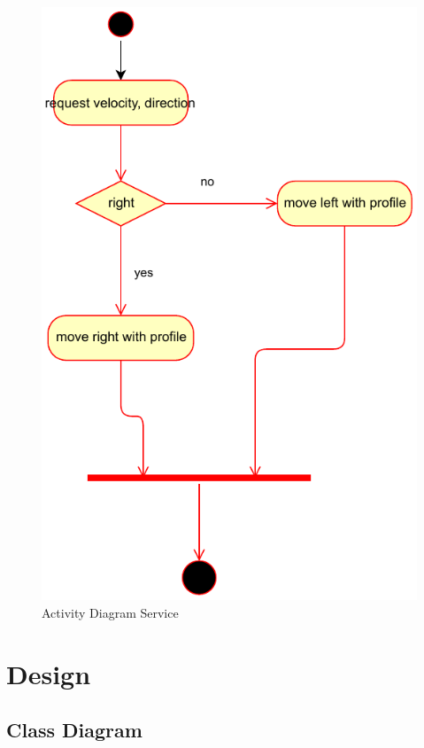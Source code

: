 \documentclass[a4paper,12pt,twoside]{scrreprt}
\begin{document}
\begin{figure}[H]
	\centering
	\includegraphics[width=\textwidth,height=\textheight,keepaspectratio]{activityDiagram/activitychartServiceMode.pdf}
	\caption[Activity Diagram Service]{Activity Diagram Service}
	\label{fig:ActivityDiagramService}
\end{figure}

\chapter{Design}

\section{Class Diagram}
\label{chap:Class_Diagram}
\end{document}
